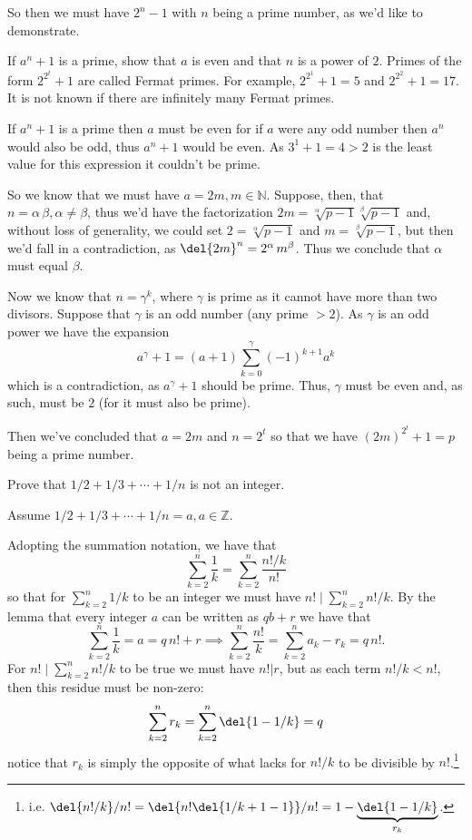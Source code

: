 \documentclass[english]{IMTexam}
\begin{document}
\begin{questions}
\begin{solution}
			So then we must have $ 2^{n}-1 $ with $ n $ being a prime number, as we'd like to demonstrate.
		\end{solution}
		
		\question\label{ques:IR:1.26} If $ a^{n} + 1 $ is a prime, show that $ a $ is even and that $ n $ is a power of $ 2 $. Primes of the form $ 2^{2^{t}} + 1 $ are called Fermat primes. For example, $ 2^{2^{1}} + 1 = 5 $ and $ 2^{2^{2}} + 1 = 17 $. It is not known if there are infinitely many Fermat primes.
		
		\begin{solution}
			If $ a^{n}+1 $ is a prime then $ a $ must be even for if $ a $ were any odd number then $ a^{n} $ would also be odd, thus $ a^{n}+1 $ would be even. As $ 3^{1}+1=4>2 $ is the least value for this expression it couldn't be prime.
			
			So we know that we must have $ a=2m,m\in\mathbb{N} $. Suppose, then, that $ n=\alpha\,\beta,\alpha\neq\beta $, thus we'd have the factorization $ 2m=\sqrt[\alpha]{p-1}\sqrt[\beta]{p-1} $ and, without loss of generality, we could set $ 2=\sqrt[\alpha]{p-1} $ and $ m=\sqrt[\beta]{p-1} $, but then we'd fall in a contradiction, as $ \del{2m}^{n}=2^{\alpha}\,m^{\beta} $. Thus we conclude that $ \alpha $ must equal $ \beta $.
			
			Now we know that $ n=\gamma^{k} $, where $ \gamma $ is prime as it cannot have more than two divisors. Suppose that $ \gamma $ is an odd number (any prime $ >2 $). As $ \gamma $ is an odd power we have the expansion
			\[ a^{\gamma}+1=(a+1)\sum_{k=0}^{\gamma}(-1)^{k+1} a^{k} \]
			which is a contradiction, as $ a^{\gamma}+1 $ should be prime. Thus, $ \gamma $ must be even and, as such, must be $ 2 $ (for it must also be prime).
			
			Then we've concluded that $ a=2m $ and $ n=2^{t} $ so that we have $ (2m)^{2^{t}}+1=p $ being a prime number.
		\end{solution}
		
		\question\label{ques:IR:1.30} Prove that $ 1/2+1/3+\cdots+1/n $ is not an integer.
		
		\begin{solution}
			Assume $ 1/2+1/3+\cdots+1/n=a,a\in\mathbb{Z} $.
			
			Adopting the summation notation, we have that
			\[ \sum_{k=2}^{n}\dfrac{1}{k}=\sum_{k=2}^{n}\dfrac{n!/k}{n!} \]
			so that for $ \sum_{k=2}^{n}1/k $ to be an integer we must have $ n!\mid\sum_{k=2}^{n}n!/k $. By the lemma that every integer $ a $ can be written as $ qb+r $ we have that
			\[ \sum_{k=2}^{n}\dfrac{1}{k}=a=q\,n!+r\implies \sum_{k=2}^{n}\dfrac{n!}{k}=\sum_{k=2}^{n}a_k-r_k=q\,n!. \]
			For $ n!\mid\sum_{k=2}^{n}n!/k $ to be true we must have $ n!|r $, but as each term $ n!/k<n! $, then this residue must be non-zero:
			\[ \sum_{k=2}^{n}r_k=\sum_{k=2}^{n}\del{1-1/k}=q \]
			notice that $ r_k $ is simply the opposite of what lacks for $ n!/k $ to be divisible by $ n! $.\footnote{i.e. $ \del{n!/k}/n! =\del{n!\del{1/k+1-1}}/n! =1-\underbrace{\del{1-1/k}}_{r_k} $.}
			

\end{solution}
\end{questions}
\end{document}
